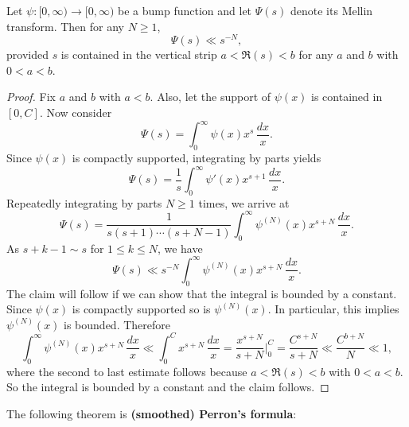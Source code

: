     \begin{proposition}\label{prop:smoothing_function_Mellin_inverse_vertical_strips}
      Let $\psi:[0,\infty) \to [0,\infty)$ be a bump function and let $\Psi(s)$ denote its Mellin transform. Then for any $N \ge 1$,
      \[
        \Psi(s) \ll s^{-N},
      \]
      provided $s$ is contained in the vertical strip $a < \Re(s) < b$ for any $a$ and $b$ with $0 < a < b$.
    \end{proposition}
    \begin{proof}
      Fix $a$ and $b$ with $a < b$. Also, let the support of $\psi(x)$ is contained in $[0,C]$. Now consider
      \[
        \Psi(s) = \int_{0}^{\infty}\psi(x)x^{s}\,\frac{dx}{x}.
      \]
      Since $\psi(x)$ is compactly supported, integrating by parts yields
      \[
        \Psi(s) = \frac{1}{s}\int_{0}^{\infty}\psi'(x)x^{s+1}\,\frac{dx}{x}.
      \]
      Repeatedly integrating by parts $N \ge 1$ times, we arrive at
      \[
        \Psi(s) = \frac{1}{s(s+1) \cdots (s+N-1)}\int_{0}^{\infty}\psi^{(N)}(x)x^{s+N}\,\frac{dx}{x}.
      \]
      As $s+k-1 \sim s$ for $1 \le k \le N$, we have
      \[
        \Psi(s) \ll s^{-N}\int_{0}^{\infty}\psi^{(N)}(x)x^{s+N}\,\frac{dx}{x}.
      \]
      The claim will follow if we can show that the integral is bounded by a constant. Since $\psi(x)$ is compactly supported so is $\psi^{(N)}(x)$. In particular, this implies $\psi^{(N)}(x)$ is bounded. Therefore
      \[
        \int_{0}^{\infty}\psi^{(N)}(x)x^{s+N}\,\frac{dx}{x} \ll \int_{0}^{C}x^{s+N}\,\frac{dx}{x} = \frac{x^{s+N}}{s+N}\bigg|_{0}^{C} = \frac{C^{s+N}}{s+N} \ll \frac{C^{b+N}}{N} \ll 1,
      \]
      where the second to last estimate follows because $a < \Re(s) < b$ with $0 < a < b$. So the integral is bounded by a constant and the claim follows.
    \end{proof}
    
    The following theorem is \textbf{(smoothed) Perron's formula}:

